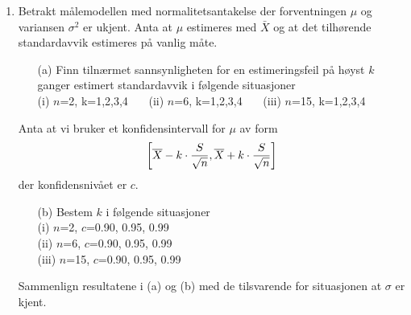 \begin{enumerate}
\item     Betrakt målemodellen med normalitetsantakelse der
          forventningen $\mu$ og variansen $\sigma ^2$ er ukjent.
          Anta at $\mu$ estimeres med $\bar X$ og at det
          tilhørende standardavvik estimeres på vanlig
          måte.
 \begin{itemize}
  \item[(a)]  Finn tilnærmet sannsynligheten for en estimeringsfeil på
       høyst $k$ ganger estimert standardavvik i følgende situasjoner\\
                  (i)   $n$=2,    k=1,2,3,4 \ \ \
                  (ii) $n$=6,    k=1,2,3,4  \ \ \
                  (iii) $n$=15,   k=1,2,3,4
 \end{itemize}
    Anta at vi bruker et konfidensintervall for $\mu$ av form
   \[ \left\lbrack \bar X - k\cdot {S\over \sqrt{n}},
        \bar X + k \cdot {S\over \sqrt{n}}\right\rbrack\]     
          der konfidensnivået er $c$.
 \begin{itemize}
  \item[(b)]  Bestem $k$ i følgende situasjoner\\
                  (i)   $n$=2,   $c$=0.90, 0.95, 0.99\\
                  (ii)  $n$=6,   $c$=0.90, 0.95, 0.99\\
                  (iii) $n$=15,   $c$=0.90, 0.95, 0.99
 \end{itemize}
          Sammenlign resultatene i (a) og (b) med de tilsvarende
          for situasjonen at $\sigma$ er kjent.


\end{enumerate}
